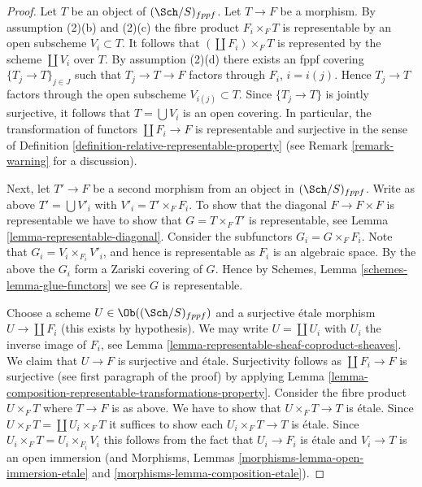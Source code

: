 \begin{proof}
Let $T$ be an object of $(\Sch/S)_{fppf}$. Let $T \to F$ be a morphism.
By assumption (2)(b) and (2)(c) the fibre product $F_i \times_F T$
is representable by an open subscheme $V_i \subset T$. It follows that
$(\coprod F_i) \times_F T$ is represented by the scheme $\coprod V_i$ over $T$.
By assumption (2)(d) there exists an fppf covering $\{T_j \to T\}_{j \in J}$
such that $T_j \to T \to F$ factors through $F_i$, $i = i(j)$.
Hence $T_j \to T$ factors through the open subscheme $V_{i(j)} \subset T$.
Since $\{T_j \to T\}$ is jointly surjective, it follows that
$T = \bigcup V_i$ is an open covering. In particular, the transformation
of functors $\coprod F_i \to F$ is representable
and surjective in the sense of
Definition \ref{definition-relative-representable-property}
(see Remark \ref{remark-warning} for a discussion).

\medskip\noindent
Next, let $T' \to F$ be a second morphism from an object in $(\Sch/S)_{fppf}$.
Write as above $T' = \bigcup V'_i$ with $V'_i = T' \times_F F_i$.
To show that the diagonal $F \to F \times F$ is representable
we have to show that $G = T \times_F T'$ is representable, see
Lemma \ref{lemma-representable-diagonal}.
Consider the subfunctors $G_i = G \times_F F_i$.
Note that $G_i = V_i \times_{F_i} V'_i$, and hence is representable
as $F_i$ is an algebraic space.
By the above the $G_i$ form a Zariski covering of $G$.
Hence by Schemes, Lemma \ref{schemes-lemma-glue-functors}
we see $G$ is representable.

\medskip\noindent
Choose a scheme $U \in \Ob((\Sch/S)_{fppf})$ and a surjective
\'etale morphism $U \to \coprod F_i$ (this exists by hypothesis).
We may write $U = \coprod U_i$ with $U_i$ the inverse image of $F_i$,
see Lemma \ref{lemma-representable-sheaf-coproduct-sheaves}.
We claim that $U \to F$ is surjective and \'etale. Surjectivity follows
as $\coprod F_i \to F$ is surjective (see first paragraph of the proof)
by applying
Lemma \ref{lemma-composition-representable-transformations-property}.
Consider the fibre product $U \times_F T$ where $T \to F$ is as
above. We have to show that $U \times_F T \to T$ is \'etale.
Since $U \times_F T = \coprod U_i \times_F T$ it suffices to show
each $U_i \times_F T \to T$ is \'etale. Since
$U_i \times_F T = U_i \times_{F_i} V_i$ this follows from the
fact that $U_i \to F_i$ is \'etale and $V_i \to T$ is an open immersion
(and Morphisms, Lemmas \ref{morphisms-lemma-open-immersion-etale}
and \ref{morphisms-lemma-composition-etale}).
\end{proof}














